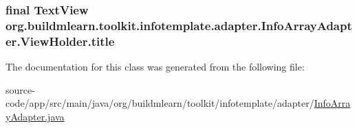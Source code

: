 \subsubsection[{\texorpdfstring{title}{title}}]{\setlength{\rightskip}{0pt plus 5cm}final Text\+View org.\+buildmlearn.\+toolkit.\+infotemplate.\+adapter.\+Info\+Array\+Adapter.\+View\+Holder.\+title}\hypertarget{classorg_1_1buildmlearn_1_1toolkit_1_1infotemplate_1_1adapter_1_1InfoArrayAdapter_1_1ViewHolder_a7643252f2b77d6945ef59b29805cf1c1}{}\label{classorg_1_1buildmlearn_1_1toolkit_1_1infotemplate_1_1adapter_1_1InfoArrayAdapter_1_1ViewHolder_a7643252f2b77d6945ef59b29805cf1c1}


The documentation for this class was generated from the following file\+:\begin{DoxyCompactItemize}
\item 
source-\/code/app/src/main/java/org/buildmlearn/toolkit/infotemplate/adapter/\hyperlink{InfoArrayAdapter_8java}{Info\+Array\+Adapter.\+java}\end{DoxyCompactItemize}
